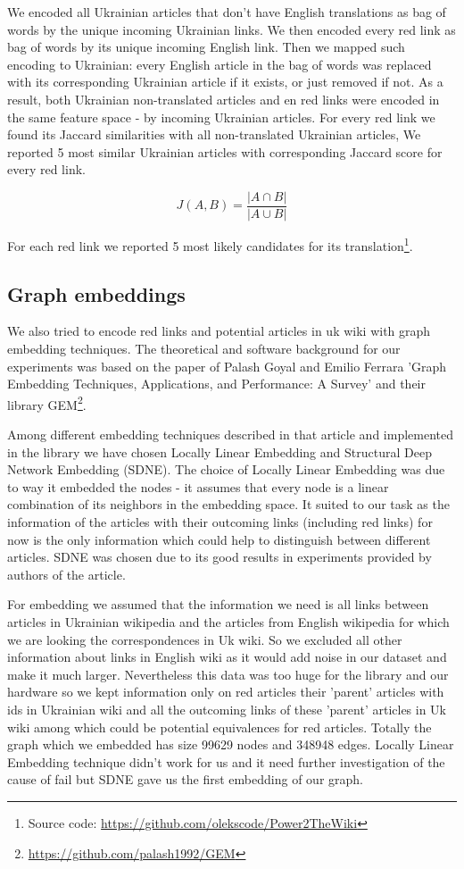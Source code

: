 \documentclass[11pt,a4paper]{article}
\begin{document}
We encoded all Ukrainian articles that don't have English translations as bag of words by the unique incoming Ukrainian links. We then encoded every red link as bag of words by its unique incoming English link. Then we mapped such encoding to Ukrainian: every English article in the bag of words was replaced with its corresponding Ukrainian article if it exists, or just removed if not. As a result, both Ukrainian non-translated articles and en red links were encoded in the same feature space - by incoming Ukrainian articles. For every red link we found its Jaccard similarities with all non-translated Ukrainian articles, We reported 5 most similar Ukrainian articles with corresponding Jaccard score for every red link.

\[ J(A, B) = \frac{|A \cap B|}{|A \cup B|} \]

For each red link we reported 5 most likely candidates for its translation\footnote{Source code: \url{https://github.com/olekscode/Power2TheWiki}}.

\subsection{Graph embeddings}

We also tried to encode red links and potential articles in uk wiki with graph embedding techniques. The theoretical and software background for our experiments was based on the paper of Palash Goyal and Emilio Ferrara 'Graph Embedding Techniques, Applications, and Performance: A Survey'\cite{goyal} and their library GEM\footnote{\url{https://github.com/palash1992/GEM}}.

Among different embedding techniques described in that article and implemented in the library we have chosen Locally Linear Embedding and Structural Deep Network Embedding (SDNE). The choice of Locally Linear Embedding was due to way it embedded the nodes - it assumes that every node is a linear combination of its neighbors in the embedding space. It suited to our task as the information of the articles with their outcoming links (including red links) for now is the only information which could help to distinguish between different articles. SDNE was chosen due to its good results in experiments provided by authors of the article.

For embedding we assumed that the information we need is all links between articles in Ukrainian wikipedia and the articles from English wikipedia for which we are looking the correspondences in Uk wiki. So we excluded all other information about links in English wiki as it would add noise in our dataset and make it much larger. Nevertheless this data was too huge for the library and our hardware so we kept information only on red articles their 'parent' articles with ids in Ukrainian wiki and all the outcoming links of these 'parent' articles in Uk wiki among which could be potential equivalences for red articles.
Totally the graph which we embedded has size 99629 nodes and 348948 edges.
Locally Linear Embedding technique didn't work for us and it need further investigation of the cause of fail but SDNE gave us the first embedding of our graph.
\end{document}
